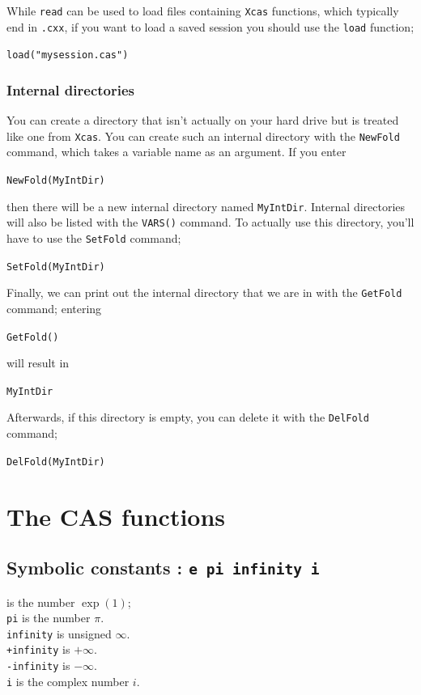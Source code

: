 \documentclass[a4paper,11pt]{book}
\begin{document}
While \texttt{read} can be used to load files containing \texttt{Xcas}
functions, which typically end in \texttt{.cxx}, if you want to load a
saved session you should use the \texttt{load} function;
\begin{center}
  {\tt load("mysession.cas")}
\end{center}

\subsection{Internal directories}

You can create a directory that isn't actually on your hard drive but
is treated like one from \texttt{Xcas}.  You can create such an
internal directory with the \texttt{NewFold} command,
which takes a variable name as an argument. If you enter
\begin{center}
  {\tt NewFold(MyIntDir)}
\end{center}
then there will be a new internal directory named \texttt{MyIntDir}.
Internal directories will also be listed with the
\texttt{VARS()}
command. To actually use this directory, you'll have to use the
\texttt{SetFold} command;
\begin{center}
  {\tt SetFold(MyIntDir)}
\end{center}
Finally, we can print out the internal directory that we are in with
the \texttt{GetFold} command; entering
\begin{center}
  {\tt GetFold()}
\end{center}
will result in
\begin{center}
  {\tt MyIntDir}
\end{center}
Afterwards, if this directory is empty, you can delete it with the
\texttt{DelFold} command;
\begin{center}
  {\tt DelFold(MyIntDir)}
\end{center}


\chapter{The CAS functions}\label{sec:cas}

\section{Symbolic constants : {\tt e pi infinity i}}
 is the number $\exp(1)$;\\ 
{\tt pi} is the number $\pi$.\\
{\tt infinity} is unsigned $\infty$.\\
{\tt +infinity} is $+\infty$.\\
{\tt -infinity} is $-\infty$.\\
{\tt i} is the complex number $i$.
\end{document}
